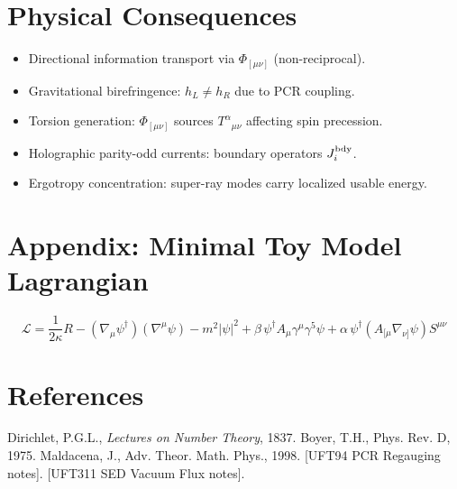 \documentclass[12pt]{article}
\begin{document}
\section{Physical Consequences}
\begin{itemize}
\item Directional information transport via $\Phi_{[\mu\nu]}$ (non-reciprocal).
\item Gravitational birefringence: $h_L \neq h_R$ due to PCR coupling.
\item Torsion generation: $\Phi_{[\mu\nu]}$ sources $T^\alpha{}_{\mu\nu}$ affecting spin precession.
\item Holographic parity-odd currents: boundary operators $J_i^{\rm bdy}$.
\item Ergotropy concentration: super-ray modes carry localized usable energy.
\end{itemize}

\section{Appendix: Minimal Toy Model Lagrangian}
\begin{equation}
\mathcal{L} = \frac{1}{2\kappa} R 
- (\nabla_\mu \psi^\dagger)(\nabla^\mu \psi) 
- m^2|\psi|^2
+ \beta\, \psi^\dagger A_\mu \gamma^\mu \gamma^5 \psi
+ \alpha\, \psi^\dagger (A_{[\mu}\nabla_{\nu]}\psi) S^{\mu\nu}
\end{equation}

\section{References}

\begin{thebibliography}{99}
 Dirichlet, P.G.L., \emph{Lectures on Number Theory}, 1837.
 Boyer, T.H., Phys. Rev. D, 1975.
 Maldacena, J., Adv. Theor. Math. Phys., 1998.
 [UFT94 PCR Regauging notes].
 [UFT311 SED Vacuum Flux notes].
\end{thebibliography}
\end{document}
